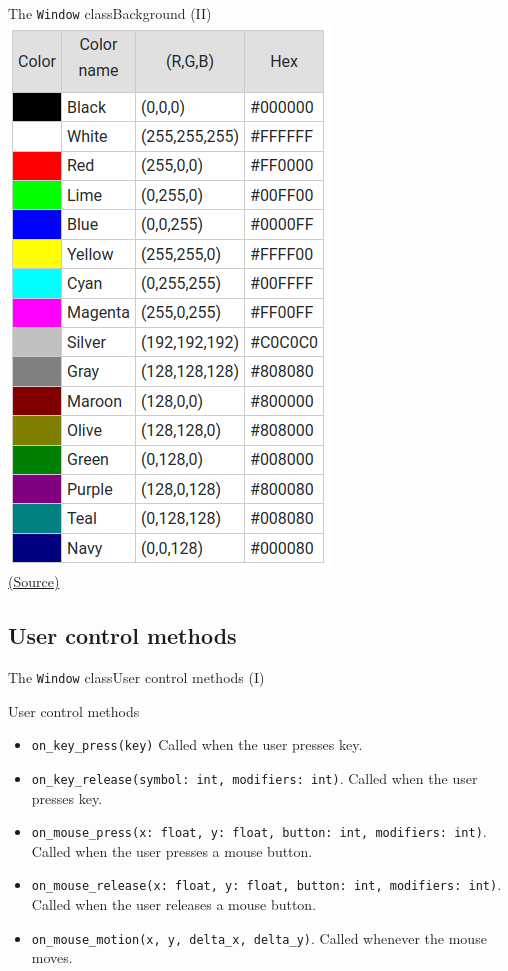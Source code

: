 \documentclass[10pt,compress]{beamer} %
\begin{document}
\begin{frame}[plain]{The \texttt{Window} class}{Background (II)}
	\centering \includegraphics[width=0.4\linewidth]{figs/colors}\\
	\tiny \href{https://www.rapidtables.com/convert/color/rgb-to-hex.html}{(Source)}
\end{frame}

\subsection{User control methods}

\begin{frame}{The \texttt{Window} class}{User control methods (I)}
	\begin{block}{User control methods}
		\begin{itemize}
		\item \footnotesize{\texttt{on\_key\_press(key)}} Called when the user presses key.
		\item \footnotesize{\texttt{on\_key\_release(symbol: int, modifiers: int)}}. Called when the user presses key.
		\item \footnotesize{\texttt{on\_mouse\_press(x: float, y: float, button: int, modifiers: int)}}. Called when the user presses a mouse button.
		\item \footnotesize{\texttt{on\_mouse\_release(x: float, y: float, button: int, modifiers: int)}}.  Called when the user releases a mouse button.
		\item \footnotesize{\texttt{on\_mouse\_motion(x, y, delta\_x, delta\_y)}}. Called whenever the mouse moves.
		\end{itemize}
	\end{block}	
\end{frame}
\end{document}
